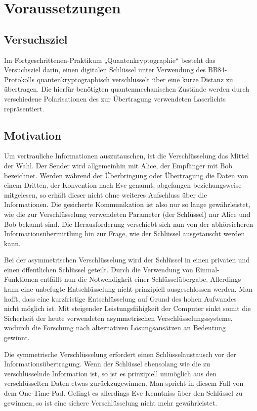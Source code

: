 \section{Voraussetzungen}

\subsection{Versuchsziel}

Im Fortgeschrittenen-Praktikum „Quantenkryptographie“ besteht das Versuchsziel
darin, einen digitalen Schlüssel unter Verwendung des BB84-Protokolls
quantenkryptographisch verschlüsselt über eine kurze Distanz zu übertragen.
Die hierfür benötigten quantenmechanischen Zustände werden durch verschiedene
Polarisationen des zur Übertragung verwendeten Laserlichts repräsentiert.

\subsection{Motivation}

Um vertrauliche Informationen auszutauschen, ist die Verschlüsselung das
Mittel der Wahl. Der Sender wird allgemeinhin mit Alice, der Empfänger mit Bob
bezeichnet. Werden während der Überbringung oder Übertragung die Daten von
einem Dritten, der Konvention nach Eve genannt, abgefangen beziehungsweise
mitgelesen, so erhält dieser nicht ohne weiteres Aufschluss über die Informationen.
Die gesicherte Kommunikation ist also nur so lange gewährleistet, wie die zur
Verschlüsselung verwendeten Parameter (der Schlüssel) nur Alice und Bob bekannt
sind. Die Herausforderung verschiebt sich nun von der abhörsicheren
Informationsübermittlung hin zur Frage, wie der Schlüssel ausgetauscht werden
kann.

Bei der asymmetrischen Verschlüsselung wird der Schlüssel in einen privaten und
einen öffentlichen Schlüssel geteilt. Durch die Verwendung von Einmal-Funktionen
entfällt nun die Notwendigkeit einer Schlüsselübergabe. Allerdings kann eine
unbefugte Entschlüsselung nicht prinzipiell ausgeschlossen werden. Man hofft,
dass eine kurzfristige Entschlüsselung auf Grund des hohen Aufwandes nicht möglich
ist. Mit steigender Leistungsfähigkeit der Computer sinkt somit die Sicherheit
der heute verwendeten asymmetrischen Verschlüsselungssysteme, wodurch die Forschung
nach alternativen Lösungsansätzen an Bedeutung gewinnt.

Die symmetrische Verschlüsselung erfordert einen Schlüsselaustausch vor der
Informationsübertragung. Wenn der Schlüssel ebensolang wie die zu verschlüsselnde
Information ist, so ist es prinzipiell unmöglich aus den verschlüsselten Daten
etwas zurückzugewinnen. Man spricht in diesem Fall von dem One-Time-Pad. Gelingt
es allerdings Eve Kenntniss über den Schlüssel zu gewinnen, so ist eine sichere
Verschlüsselung nicht mehr gewährleistet.

